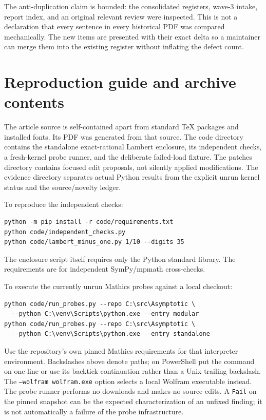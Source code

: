 \documentclass[11pt,letterpaper]{article}
\newcommand{\code}[1]{\texttt{#1}}
\begin{document}
The anti-duplication claim is bounded: the consolidated registers, wave-3 intake, report index, and an original relevant review were inspected. This is not a declaration that every sentence in every historical PDF was compared mechanically. The new items are presented with their exact delta so a maintainer can merge them into the existing register without inflating the defect count.

\section{Reproduction guide and archive contents}

The article source is self-contained apart from standard TeX packages and installed fonts. Its PDF was generated from that source. The code directory contains the standalone exact-rational Lambert enclosure, its independent checks, a fresh-kernel probe runner, and the deliberate failed-load fixture. The patches directory contains focused edit proposals, not silently applied modifications. The evidence directory separates actual Python results from the explicit unrun kernel status and the source/novelty ledger.

To reproduce the independent checks:
\begin{lstlisting}
python -m pip install -r code/requirements.txt
python code/independent_checks.py
python code/lambert_minus_one.py 1/10 --digits 35
\end{lstlisting}
The enclosure script itself requires only the Python standard library. The requirements are for independent SymPy/mpmath cross-checks.

To execute the currently unrun Mathics probes against a local checkout:
\begin{lstlisting}
python code/run_probes.py --repo C:\src\Asymptotic \
  --python C:\venv\Scripts\python.exe --entry modular
python code/run_probes.py --repo C:\src\Asymptotic \
  --python C:\venv\Scripts\python.exe --entry standalone
\end{lstlisting}
Use the repository's own pinned Mathics requirements for that interpreter environment. Backslashes above denote paths; on PowerShell put the command on one line or use its backtick continuation rather than a Unix trailing backslash. The \code{--wolfram wolfram.exe} option selects a local Wolfram executable instead. The probe runner performs no downloads and makes no source edits. A \code{Fail} on the pinned snapshot can be the expected characterization of an unfixed finding; it is not automatically a failure of the probe infrastructure.
\end{document}
